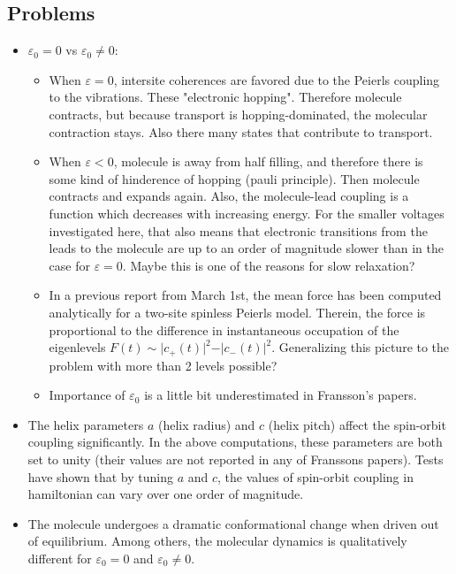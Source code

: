 \documentclass{article}
\begin{document}
\subsection{Problems}
\begin{itemize}
		\item $\varepsilon_0 = 0$ vs $\varepsilon_0 \neq 0$: 
	\begin{itemize}
		\item   When $\varepsilon=0$, intersite coherences are favored due to the Peierls coupling to the vibrations. These "electronic hopping". Therefore molecule contracts, but because transport is hopping-dominated, the molecular contraction stays. Also there many states that contribute to transport.  
		\item When $\varepsilon <0$, molecule is away from half filling, and therefore there is some kind of hinderence of hopping (pauli principle). Then molecule contracts and expands again. Also, the molecule-lead coupling is a function which decreases with increasing energy. For the smaller voltages investigated here, that also means that electronic transitions from the leads to the molecule are up to an order of magnitude slower than in the case for $\varepsilon=0$.
		Maybe this is one of the reasons for slow relaxation? 
		\item In a previous report from March 1st, the mean force has been computed analytically for a two-site spinless Peierls model. Therein, the force is proportional to the difference in instantaneous occupation of the eigenlevels $F(t)\sim \vert c_+(t)\vert^2-\vert c_-(t)\vert^2$. Generalizing this picture to the problem with more than 2 levels possible?
		\item Importance of $\varepsilon_0$ is a little bit underestimated in Fransson's papers. 
	\end{itemize}
	\item The helix parameters $a$ (helix radius) and $c$ (helix pitch) affect the spin-orbit coupling significantly. In the above computations, these parameters are both set to unity (their values are not reported in any of Franssons papers). Tests have shown that by tuning $a$ and $c$, the values of spin-orbit coupling in hamiltonian can vary over one order of magnitude.
	\item The molecule undergoes a dramatic conformational change when driven out of equilibrium. Among others, the molecular dynamics is qualitatively different for $\varepsilon_0=0$ and $\varepsilon_0\neq 0$. 

\end{itemize}
\end{document}

